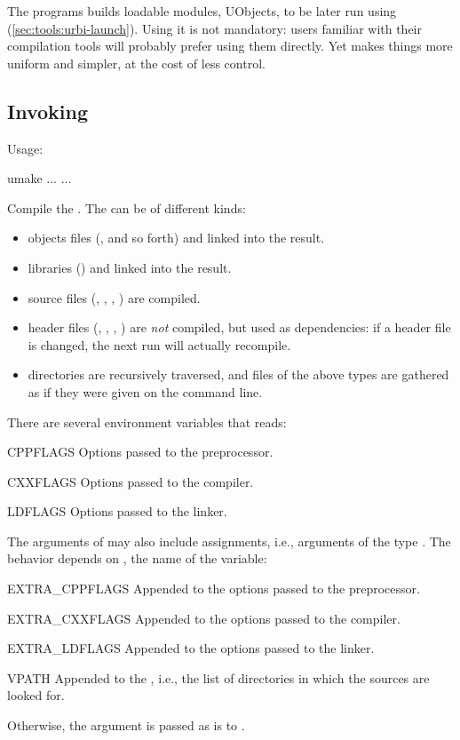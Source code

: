 The  programs builds loadable modules, UObjects, to be
later run using 
(\autoref{sec:tools:urbi-launch}).  Using it is not mandatory: users
familiar with their compilation tools will probably prefer using them
directly.  Yet  makes things more uniform and simpler,
at the cost of less control.

\subsection{Invoking }
\label{sec:tools:umake:invoke}

Usage:
\begin{shell}
umake ... ...
\end{shell}

Compile the .  The  can be of different kinds:
\begin{itemize}
\item objects files (,  and so forth) and linked
  into the result.
\item libraries () and linked into the result.
\item source files (, , , )
  are compiled.
\item header files (, , ,
  ) are \emph{not} compiled, but used as dependencies: if
  a header file is changed, the next  run will actually
  recompile.
\item directories are recursively traversed, and files of the above
  types are gathered as if they were given on the command line.
\end{itemize}

There are several environment variables that  reads:
\begin{envs}
\item[CPPFLAGS] Options passed to the preprocessor.
\item[CXXFLAGS] Options passed to the \Cxx compiler.
\item[LDFLAGS] Options passed to the linker.
\end{envs}

The arguments of  may also include assignments, i.e.,
arguments of the type .  The behavior depends on
, the name of the variable:
\begin{envs}
\item[EXTRA\_CPPFLAGS] Appended to the options passed to the preprocessor.
\item[EXTRA\_CXXFLAGS] Appended to the options passed to the \Cxx compiler.
\item[EXTRA\_LDFLAGS]  Appended to the options passed to the linker.
\item[VPATH] Appended to the , i.e., the list of directories in
  which the sources are looked for.
\end{envs}
\noindent
Otherwise, the argument is passed as is to .


